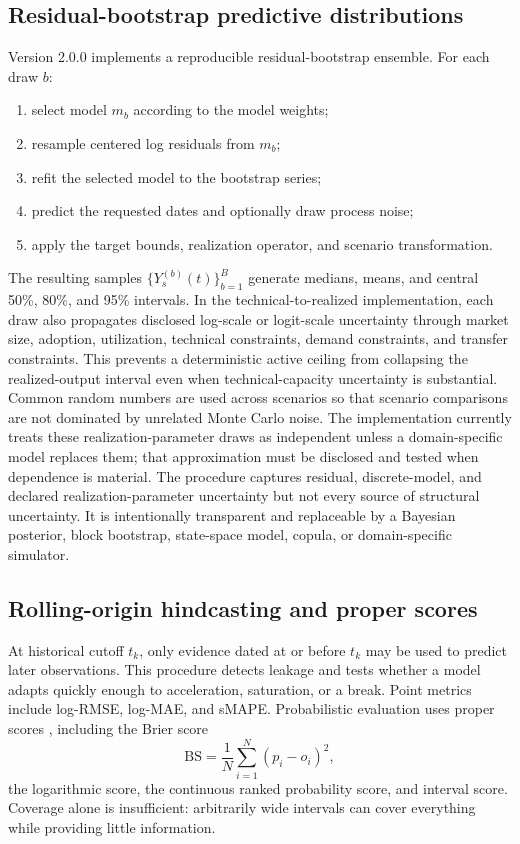 \subsection{Residual-bootstrap predictive distributions}

Version 2.0.0 implements a reproducible residual-bootstrap ensemble. For each draw $b$:
\begin{enumerate}
\item select model $m_b$ according to the model weights;
\item resample centered log residuals from $m_b$;
\item refit the selected model to the bootstrap series;
\item predict the requested dates and optionally draw process noise;
\item apply the target bounds, realization operator, and scenario transformation.
\end{enumerate}
The resulting samples $\{Y_s^{(b)}(t)\}_{b=1}^{B}$ generate medians, means, and central 50\%, 80\%, and 95\% intervals. In the technical-to-realized implementation, each draw also propagates disclosed log-scale or logit-scale uncertainty through market size, adoption, utilization, technical constraints, demand constraints, and transfer constraints. This prevents a deterministic active ceiling from collapsing the realized-output interval even when technical-capacity uncertainty is substantial. Common random numbers are used across scenarios so that scenario comparisons are not dominated by unrelated Monte Carlo noise. The implementation currently treats these realization-parameter draws as independent unless a domain-specific model replaces them; that approximation must be disclosed and tested when dependence is material. The procedure captures residual, discrete-model, and declared realization-parameter uncertainty but not every source of structural uncertainty. It is intentionally transparent and replaceable by a Bayesian posterior, block bootstrap, state-space model, copula, or domain-specific simulator.

\subsection{Rolling-origin hindcasting and proper scores}

At historical cutoff $t_k$, only evidence dated at or before $t_k$ may be used to predict later observations. This procedure detects leakage and tests whether a model adapts quickly enough to acceleration, saturation, or a break. Point metrics include log-RMSE, log-MAE, and sMAPE. Probabilistic evaluation uses proper scores \citep{gneiting2007}, including the Brier score
\begin{equation}
\mathrm{BS}=\frac{1}{N}\sum_{i=1}^{N}(p_i-o_i)^2,
\end{equation}
the logarithmic score, the continuous ranked probability score, and interval score. Coverage alone is insufficient: arbitrarily wide intervals can cover everything while providing little information.

